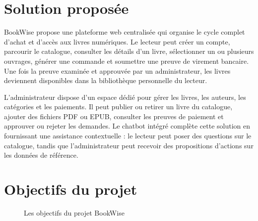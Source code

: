 \documentclass[12pt,a4paper]{report}
\begin{document}
\section{Solution proposée}

BookWise propose une plateforme web centralisée qui organise le cycle complet d'achat et d'accès aux livres numériques. Le lecteur peut créer un compte, parcourir le catalogue, consulter les détails d'un livre, sélectionner un ou plusieurs ouvrages, générer une commande et soumettre une preuve de virement bancaire. Une fois la preuve examinée et approuvée par un administrateur, les livres deviennent disponibles dans la bibliothèque personnelle du lecteur.

L'administrateur dispose d'un espace dédié pour gérer les livres, les auteurs, les catégories et les paiements. Il peut publier ou retirer un livre du catalogue, ajouter des fichiers PDF ou EPUB, consulter les preuves de paiement et approuver ou rejeter les demandes. Le chatbot intégré complète cette solution en fournissant une assistance contextuelle : le lecteur peut poser des questions sur le catalogue, tandis que l'administrateur peut recevoir des propositions d'actions sur les données de référence.

\section{Objectifs du projet}

\begin{figure}[htbp]
    \centering
    \caption{Les objectifs du projet BookWise}
\end{figure}
\end{document}
